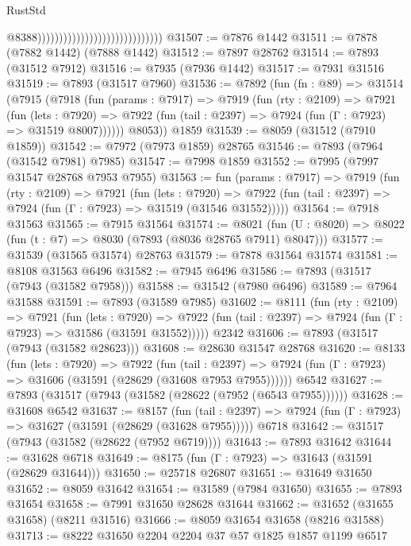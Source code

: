 \begin{lexlean}{RustStd}
\begin{coremodule}
                                                              @8388)))))))))))))))))))))))))))))
@31507 := @7876 @1442
@31511 := @7878 (@7882 @1442) (@7888 @1442)
@31512 := @7897 @28762
@31514 := @7893 (@31512 @7912)
@31516 := @7935 (@7936 @1442)
@31517 := @7931 @31516
@31519 := @7893 (@31517 @7960)
@31536 := @7892
    (fun (fn : @89) =>
    @31514
      (@7915
        (@7918
          (fun (params : @7917) =>
          @7919
            (fun (rty : @2109) =>
            @7921
              (fun (lets : @7920) =>
              @7922 (fun (tail : @2397) => @7924 (fun (Γ : @7923) => @31519 @8007))))))
        @8053))
    @1859
@31539 := @8059 (@31512 (@7910 @1859))
@31542 := @7972 (@7973 @1859) @28765
@31546 := @7893 (@7964 (@31542 @7981) @7985)
@31547 := @7998 @1859
@31552 := @7995 (@7997 @31547 @28768 @7953 @7955)
@31563 := fun (params : @7917) =>
  @7919
    (fun (rty : @2109) =>
    @7921
      (fun (lets : @7920) =>
      @7922 (fun (tail : @2397) => @7924 (fun (Γ : @7923) => @31519 (@31546 @31552)))))
@31564 := @7918 @31563
@31565 := @7915 @31564
@31574 := @8021
    (fun (U : @8020) => @8022 (fun (t : @7) => @8030 (@7893 (@8036 @28765 @7911) @8047)))
@31577 := @31539 (@31565 @31574) @28763
@31579 := @7878 @31564 @31574
@31581 := @8108 @31563 @6496
@31582 := @7945 @6496
@31586 := @7893 (@31517 (@7943 (@31582 @7958)))
@31588 := @31542 (@7980 @6496)
@31589 := @7964 @31588
@31591 := @7893 (@31589 @7985)
@31602 := @8111
    (fun (rty : @2109) =>
    @7921
      (fun (lets : @7920) =>
      @7922 (fun (tail : @2397) => @7924 (fun (Γ : @7923) => @31586 (@31591 @31552)))))
    @2342
@31606 := @7893 (@31517 (@7943 (@31582 @28623)))
@31608 := @28630 @31547 @28768
@31620 := @8133
    (fun (lets : @7920) =>
    @7922
      (fun (tail : @2397) =>
      @7924 (fun (Γ : @7923) => @31606 (@31591 (@28629 (@31608 @7953 @7955))))))
    @6542
@31627 := @7893 (@31517 (@7943 (@31582 (@28622 (@7952 (@6543 @7955))))))
@31628 := @31608 @6542
@31637 := @8157
    (fun (tail : @2397) => @7924 (fun (Γ : @7923) => @31627 (@31591 (@28629 (@31628 @7955)))))
    @6718
@31642 := @31517 (@7943 (@31582 (@28622 (@7952 @6719))))
@31643 := @7893 @31642
@31644 := @31628 @6718
@31649 := @8175 (fun (Γ : @7923) => @31643 (@31591 (@28629 @31644)))
@31650 := @25718 @26807
@31651 := @31649 @31650
@31652 := @8059 @31642
@31654 := @31589 (@7984 @31650)
@31655 := @7893 @31654
@31658 := @7991 @31650 @28628 @31644
@31662 := @31652 (@31655 @31658) (@8211 @31516)
@31666 := @8059 @31654 @31658 (@8216 @31588)
@31713 := @8222
    @31650
    @2204
    @2204
    @37
    @57
    @1825
    @1857
    @1199
    @6517

\end{coremodule}
\end{lexlean}
